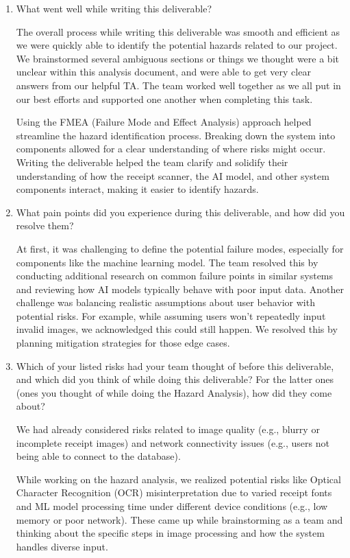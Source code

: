 \documentclass{article}
\begin{document}
\begin{enumerate}

\item What went well while writing this deliverable?

The overall process while writing this deliverable was smooth and efficient as we were quickly able to identify the potential hazards related to our project. We brainstormed several ambiguous sections or things we thought were a bit unclear within this analysis document, and were able to get very clear answers from our helpful TA. The team worked well together as we all put in our best efforts and supported one another when completing this task. 

Using the FMEA (Failure Mode and Effect Analysis) approach helped streamline the hazard identification process. Breaking down the system into components allowed for a clear understanding of where risks might occur. Writing the deliverable helped the team clarify and solidify their understanding of how the receipt scanner, the AI model, and other system components interact, making it easier to identify hazards.

\item What pain points did you experience during this deliverable, and how did you resolve them?

At first, it was challenging to define the potential failure modes, especially for components like the machine learning model. The team resolved this by conducting additional research on common failure points in similar systems and reviewing how AI models typically behave with poor input data. Another challenge was balancing realistic assumptions about user behavior with potential risks. For example, while assuming users won’t repeatedly input invalid images, we acknowledged this could still happen. We resolved this by planning mitigation strategies for those edge cases.

\item Which of your listed risks had your team thought of before this deliverable, and which did you think of while doing this deliverable? For the latter ones (ones you thought of while doing the Hazard Analysis), how did they come about?

We had already considered risks related to image quality (e.g., blurry or incomplete receipt images) and network connectivity issues (e.g., users not being able to connect to the database).

While working on the hazard analysis, we realized potential risks like Optical Character Recognition (OCR) misinterpretation due to varied receipt fonts and ML model processing time under different device conditions (e.g., low memory or poor network). These came up while brainstorming as a team and thinking about the specific steps in image processing and how the system handles diverse input.


\end{enumerate}
\end{document}
